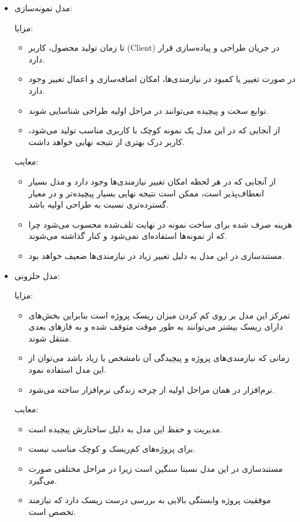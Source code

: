 {\begin{itemize}
\item مدل نمونه‌سازی:


مزایا:
\begin{itemize}
\item
تا زمان تولید محصول، کاربر (Client) در جریان طراحی و پیاده‌سازی قرار دارد.
\item 
در صورت تغییر یا کمبود در نیازمندی‌ها، امکان اضافه‌سازی و اعمال تغییر وجود دارد.
\item 
توابع سخت و پیچیده می‌توانند در مراحل اولیه طراحی شناسایی شوند.
\item 
از آنجایی که در این مدل یک نمونه کوچک با کاربری مناسب تولید می‌شود، کاربر درک بهتری از نتیجه نهایی خواهد داشت. 
\end{itemize}
معایب:
\begin{itemize}
\item 
از آنجایی که در هر لحظه امکان تغییر نیازمندی‌ها وجود دارد و مدل بسیار انعطاف‌پذیر است، ممکن است نتیجه نهایی بسیار پیچیده‌تر و در معیار گسترده‌تری نسبت به طراحی اولیه باشد.
\item
 هزینه صرف شده برای ساخت نمونه در نهایت تلف‌شده محسوب می‌شود چرا که از نمونه‌ها استفاده‌ای نمی‌شود و کنار گذاشته می‌شوند.
\item
  مستندسازی در این مدل به دلیل تغییر زیاد در نیازمندی‌ها ضعیف خواهد بود. 
\end{itemize}


\item مدل حلزونی:

مزایا:
\begin{itemize}
\item 
 تمرکز این مدل بر روی کم کردن میزان ریسک پروژه است بنابراین بخش‌های دارای ریسک بیشتر می‌توانند به طور موقت متوقف شده و به فازهای بعدی منتقل شوند.
\item
  زمانی که نیازمندی‌های پروژه و پیچیدگی آن نامشخص یا زیاد باشد می‌توان از این مدل استفاده نمود.
\item
  نرم‌افزار در همان مراحل اولیه از چرخه زندگی نرم‌افزار  ساخته‌ می‌شود.
\end{itemize}

معایب:
\begin{itemize}
\item 
مدیریت و حفظ این مدل به دلیل ساختارش پیچیده است.
\item
برای پروژه‌های کم‌ریسک و کوچک مناسب نیست.
\item
مستندسازی در این مدل نسبتا سنگین است زیرا در مراحل مختلفی صورت می‌گیرد.
\item
 موفقیت پروژه وابستگی بالایی به بررسی درست ریسک  دارد که نیازمند تخصص است.
\end{itemize}


\end{itemize}}
